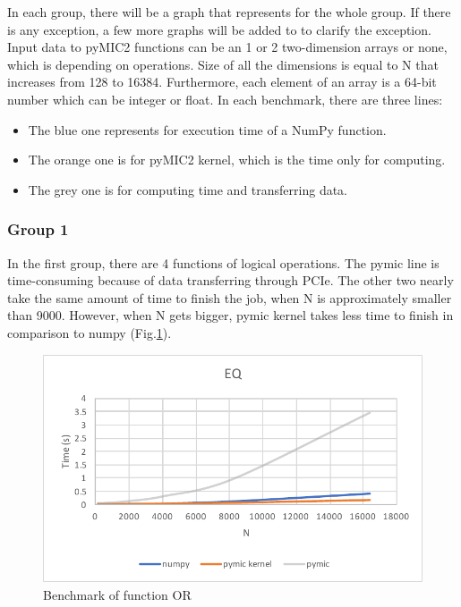 In each group, there will be a graph that represents for the whole group. If there is any exception, a few more graphs will be added to to clarify the exception. Input data to pyMIC2 functions can be an 1 or 2 two-dimension arrays or none, which is depending on operations. Size of all the dimensions is equal to N that increases from 128 to 16384. Furthermore, each element of an array is a 64-bit number which can be integer or float. In each benchmark, there are three lines:
\begin{itemize}
	\item The blue one represents for execution time of a NumPy function.
	\item The orange one is for pyMIC2 kernel, which is the time only for computing.
	\item The grey one is for computing time and transferring data.
\end{itemize}

\subsubsection{Group 1}


In the first group, there are 4 functions of logical operations. The pymic line is time-consuming because of data transferring through PCIe. The other two nearly take the same amount of time to finish the job, when N is approximately smaller than 9000. However, when N gets bigger, pymic kernel takes less time to finish in comparison to numpy (Fig.\ref{fig:group1}).

\begin{figure}[]
\includegraphics[scale=0.5]{img/group1/eq.pdf}
\centering
\caption{Benchmark of function OR}
\label{fig:group1}
\end{figure}

